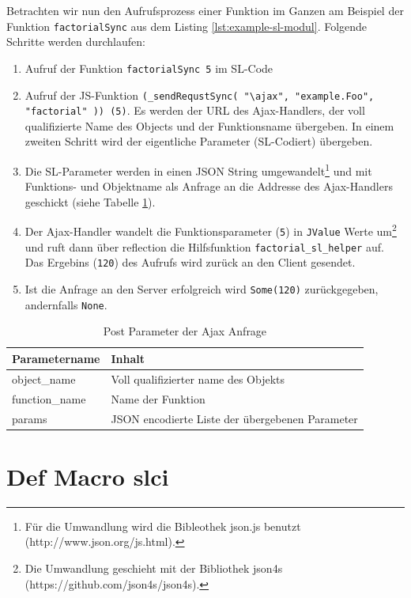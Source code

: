 \documentclass[12pt]{scrreprt}
\begin{document}
Betrachten wir nun den Aufrufsprozess einer Funktion im Ganzen am Beispiel der Funktion \lstinline!factorialSync! aus dem Listing \ref{lst:example-sl-modul}. Folgende Schritte werden durchlaufen:
\begin{enumerate}
 \item{Aufruf der Funktion \lstinline!factorialSync 5! im \ac{SL}-Code}
 \item{Aufruf der \ac{JS}-Funktion \lstinline!(_sendRequstSync( "\ajax", "example.Foo", "factorial" )) (5)!. Es werden der \ac{URL} des Ajax-Handlers, der voll qualifizierte Name des Objects und der Funktionsname übergeben. In einem zweiten Schritt wird der eigentliche Parameter (\ac{SL}-Codiert) übergeben.}
 \item{Die \ac{SL}-Parameter werden in einen JSON String umgewandelt\footnote{Für die Umwandlung wird die Bibleothek json.js benutzt (http://www.json.org/js.html).} und mit Funktions- und Objektname als Anfrage an die Addresse des Ajax-Handlers geschickt (siehe Tabelle \ref{tab:post-parameter}).}
 \item{Der Ajax-Handler wandelt die Funktionsparameter (\lstinline!5!) in \lstinline!JValue! Werte um\footnote{Die Umwandlung geschieht mit der Bibliothek json4s (https://github.com/json4s/json4s).} und ruft dann über reflection die Hilfsfunktion \lstinline!factorial_sl_helper! auf. Das Ergebins (\lstinline!120!) des Aufrufs wird zurück an den Client gesendet.}
 \item{Ist die Anfrage an den Server erfolgreich wird \lstinline!Some(120)! zurückgegeben, andernfalls \lstinline!None!.}
\end{enumerate}

\begin{table}[h]
\caption{Post Parameter der Ajax Anfrage}
\centering
\begin{tabular}{ll}
Parametername        &   Inhalt \\
\hline
object\_name   & Voll qualifizierter name des Objekts \\
function\_name & Name der Funktion\\
params         & JSON encodierte Liste der übergebenen Parameter\\
\end{tabular}
\label{tab:post-parameter}
\end{table}

\section{Def Macro slci}
\label{sec:inline-macro}
\end{document}

